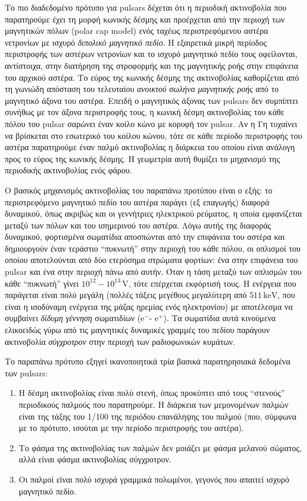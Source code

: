Το πιο διαδεδομένο πρότυπο για pulsars δέχεται ότι η περιοδική ακτινοβολία που παρατηρούμε έχει τη μορφή κωνικής δέσμης και προέρχεται από την περιοχή των μαγνητικών πόλων (polar cap model) ενός ταχέως περιστρεφόμενου αστέρα νετρονίων με ισχυρό \textit{διπολικό μαγνητικό πεδίο}. Η εξαιρετικά μικρή περίοδος περιστροφής των αστέρων νετρονίων και το ισχυρό μαγνητικό πεδίο τους οφείλονται, αντίστοιχα, στην διατήρηση της στροφορμής και της μαγνητικής ροής στην επιφάνεια του αρχικού αστέρα. Το εύρος της κωνικής δέσμης της ακτινοβολίας καθορίζεται από τη γωνιώδη απόσταση του τελευταίου \textit{ανοικτού σωλήνα μαγνητικής ροής} από το μαγνητικό άξονα του αστέρα. Επειδή ο μαγνητικός άξονας των pulsars δεν συμπίπτει συνήθως με τον άξονα περιστροφής τους, η κωνική δέσμη ακτινοβολίας του κάθε πόλου του pulsar σαρώνει έναν κοίλο κώνο με κορυφή τον pulsar. Αν η Γη τυχαίνει να βρίσκεται στο εσωτερικό του κοίλου κώνου, τότε σε κάθε περίοδο περιστροφής του αστέρα παρατηρούμε έναν παλμό ακτινοβολίας η διάρκεια του οποίου είναι ανάλογη προς το εύρος της κωνικής δέσμης. Η γεωμετρία αυτή θυμίζει το μηχανισμό της περιοδικής ακτινοβολίας ενός φάρου. 

Ο βασικός μηχανισμός ακτινοβολίας του παραπάνω προτύπου είναι ο εξής: το περιστρεφόμενο μαγνητικό πεδίο του αστέρα παράγει (εξ επαγωγής) διαφορά δυναμικού, όπως ακριβώς και οι γεννήτριες ηλεκτρικού ρεύματος, η οποία εμφανίζεται μεταξύ των πόλων και του ισημερινού του αστέρα. Λόγω αυτής της διαφοράς δυναμικού, φορτισμένα σωματίδια αποσπώνται από την επιφάνεια του αστέρα και δημιουργούν έναν τεράστιο ``πυκνωτή'' στην περιοχή του κάθε πόλου, οι οπλισμοί του οποίου αποτελούνται από δύο ετερόσημα στρώματα φορτίων: ένα στην επιφάνεια του pulsar και ένα στην περιοχή πάνω από αυτήν. Όταν η τάση μεταξύ των οπλισμών του κάθε ``πυκνωτή'' γίνει $10^{12} - 10^{13}\,\text{V}$, τότε επέρχεται εκφόρτισή τους. Η ενέργεια που παράγεται είναι πολύ μεγάλη (πολλές τάξεις μεγέθους μεγαλύτερη από $511\,\text{keV}$, που είναι η ισοδύναμη ενέργεια της μάζας ηρεμίας ενός ηλεκτρονίου) με αποτέλεσμα να συμβαίνει \textit{δίδυμη γέννηση} σωματιδίων (e$^{-}$- e$^{+}$). Τα σωματίδια αυτά κινούμενα ελικοειδώς γύρω από τις μαγνητικές δυναμικές γραμμές του πεδίου παράγουν ακτινοβολία \textit{σύγχροτρον} στην περιοχή των ραδιοφωνικών κυμάτων.

Το παραπάνω πρότυπο εξηγεί ικανοποιητικά τρία βασικά παρατηρησιακά δεδομένα των pulsars:
\begin{enumerate}
    \item Η δέσμη ακτινοβολίας είναι πολύ στενή, όπως προκύπτει από τους ``στενούς'' περιοδικούς παλμούς που παρατηρούμε. Η διάρκεια των μεμονομένων παλμών είναι της τάξης του 1/100 της περιόδου επανάληψης του παλμού (που, σύμφωνα με το πρότυπο, ισούται με την περίοδο περιστροφής του αστέρα).
    \item Το φάσμα της ακτινοβολίας των παλμών δεν μοιάζει με φάσμα μελανού σώματος, αλλά είναι φάσμα ακτινοβολίας σύγχροτρον.
    \item Οι παλμοί είναι πολύ ισχυρά γραμμικά πολωμένοι, γεγονός που απαιτεί ισχυρό μαγνητικό πεδίο.
\end{enumerate}

